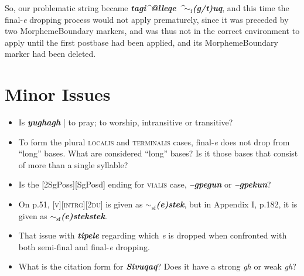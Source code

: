\documentclass{article}
\begin{document}
\begin{enumerate}
So, our problematic string became \textit{\textbf{tagi\textasciicircum @lleqe \textasciicircum ${\sim}_\text{f}$(g/t)uq}}, and this time the final-\textit{e} dropping process would not apply prematurely, since it was preceded by two MorphemeBoundary markers, and was thus not in the correct environment to apply until the first postbase had been applied, and its MorphemeBoundary marker had been deleted.

\end{enumerate}


\section{Minor Issues}

\begin{itemize}
\renewcommand\labelitemi{$\cdot$}

\item Is \textit{\textbf{yughagh}} | to pray; to worship, intransitive or transitive?

\item To form the plural \textsc{localis} and \textsc{terminalis} cases, final-\textit{e} does not drop from ``long'' bases.
%
What are considered ``long'' bases?
%
Is it those bases that consist of more than a single syllable?

\item Is the [2SgPoss][SgPosd] ending for \textsc{vialis} case, \textit{\textbf{--gpegun}} or \textit{\textbf{--gpekun}}?

\item On p.51, \textsc{[v][intrg][2du]} is given as \textit{\textbf{$\sim_\text{sf}$(e)stek}}, but in Appendix I, p.182, it is given as \textit{\textbf{$\sim_\text{sf}$(e)stekstek}}.

\item That issue with \textit{\textbf{tipele}} regarding which \textit{e} is dropped when confronted with both semi-final and final-\textit{e} dropping.

\item What is the citation form for \textit{\textbf{Sivuqaq}}?
%
Does it have a strong \textit{gh} or weak \textit{gh}?

\end{itemize}
\end{document}
